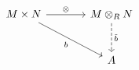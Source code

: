 \documentclass[border=6pt]{standalone}
\begin{document}
$
\begin{tikzcd}[column sep=large, row sep=large]
  M \times N \arrow[r, "\otimes"] \arrow[dr, "b"'] & M \otimes_R N \arrow[d, "\tilde{b}", dashed] \\
  & A
\end{tikzcd}
$
\end{document}
